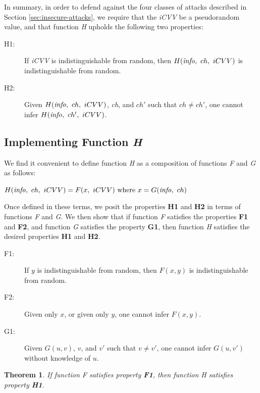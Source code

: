 In summary, in order to defend against the four classes of attacks described in Section \ref{sec:insecure-attacks},
	we require that the \emph{iCVV} be a pseudorandom value, and that function \emph{H} upholds the following two properties:

\begin{description}
\item[H1:] If \emph{iCVV} is indistinguishable from random, then $H(\textrm{\emph{info}},~ ch,~ iCVV)$ is indistinguishable from random.
\item[H2:] Given $H(\textrm{\emph{info}},~ ch,~ iCVV)$, \emph{ch}, and $ch'$ such that $ch \neq ch'$, one cannot infer $H(\textrm{\emph{info}},~ ch',~ iCVV)$.
\end{description}









\subsection{Implementing Function \emph{H}}

We find it convenient to define function \emph{H} as a composition of functions \emph{F} and \emph{G} as follows:

$H(\textrm{\emph{info}},~ ch,~ iCVV) = F(x,~ iCVV) \textrm{ where } x = G(\textrm{\emph{info}},~ ch)$

Once defined in these terms, we posit the properties \textbf{H1} and \textbf{H2} in terms of functions \emph{F} and \emph{G}.
We then show that if function \emph{F} satisfies the properties \textbf{F1} and \textbf{F2}, and function \emph{G} satisfies the property \textbf{G1},
then function \emph{H} satisfies the desired properties \textbf{H1} and \textbf{H2}.

\begin{description}
\item[F1:] If $y$ is indistinguishable from random, then $F(x, y)$ is indistinguishable from random.
\item[F2:] Given only $x$, or given only $y$, one cannot infer $F(x, y)$.
\item[G1:] Given $G(u, v)$, $v$, and $v'$ such that $v \neq v'$, one cannot infer $G(u, v')$ without knowledge of $u$.
\end{description}

\newtheorem{theorem}{Theorem}

\begin{theorem}
If function \emph{F} satisfies property \textbf{F1}, then function \emph{H} satisfies property \textbf{H1}.
\end{theorem}

